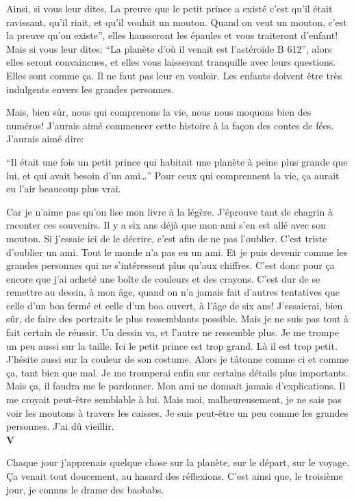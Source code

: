 \begin{Parallel}[p]{}{}
{Ainsi, si vous leur dites, La preuve que le petit
prince a existé c'est qu'il était ravissant, qu'il riait, et
qu'il voulait un mouton. Quand on veut un mouton,
c'est la preuve qu'on existe'', elles hausseront les
épaules et vous traiteront d'enfant! Mais si vous leur
dites: ``La planète d'où il venait est l'astéroïde B 
612'', alors elles seront convaincues, et elles vous
laisseront tranquille avec leurs questions. Elles sont
comme ça. Il ne faut pas leur en vouloir. Les enfants
doivent être très indulgents envers les grandes personnes.

Mais, bien sûr, nous qui comprenons la vie, nous
nous moquons bien des numéros! J'aurais aimé
commencer cette histoire à la façon des contes de
fées. J'aurais aimé dire:

``Il était une fois un petit prince qui habitait une
planète à peine plus grande que lui, et qui avait
besoin d'un ami\ldots{}'' Pour ceux qui comprennent la
vie, ça aurait eu l'air beaucoup plus vrai.

Car je n'aime pas qu'on lise mon livre à la légère.
J'éprouve tant de chagrin à raconter ces souvenirs. Il y a
six ans déjà que mon ami s'en est allé avec son
mouton. Si j'essaie ici de le décrire, c'est afin de ne
pas l'oublier. C'est triste d'oublier un ami. Tout le
monde n'a pas eu un ami. Et je puis devenir comme les grandes personnes qui ne s'intéressent plus
qu'aux chiffres. C'est donc pour ça encore que j'ai
acheté une boîte de couleurs et des crayons. C'est
dur de se remettre au dessin, à mon âge, quand on
n'a jamais fait d'autres tentatives que celle d'un boa
fermé et celle d'un boa ouvert, à l'âge de six ans!
J'essaierai, bien sûr, de faire des portraits le plus ressemblants possible. Mais je ne suis pas tout à fait certain de réussir. Un dessin va, et l'autre ne ressemble
plus. Je me trompe un peu aussi sur la taille. Ici le
petit prince est trop grand. Là il est trop petit. J'hésite aussi sur la couleur de son costume. Alors je
tâtonne comme ci et comme ça, tant bien que mal.
Je me tromperai enfin sur certains détails plus
importants. Mais ça, il faudra me le pardonner. Mon
ami ne donnait jamais d'explications. Il me croyait
peut-être semblable à lui. Mais moi, malheureusement, je ne sais pas voir les moutons à travers les
caisses. Je suis peut-être un peu comme les grandes
personnes. J'ai dû vieillir.\\

\textbf{V}

Chaque jour j'apprenais quelque chose sur la
planète, sur le départ, sur le voyage. Ça venait tout
doucement, au hasard des réflexions. C'est ainsi
que, le troisième jour, je connus le drame des baobabs.

}
\end{Parallel}
